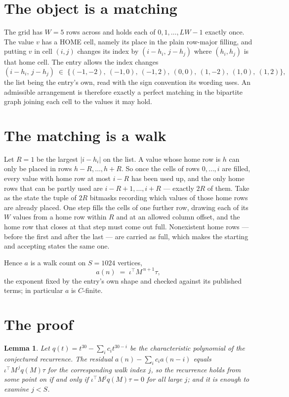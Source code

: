 \documentclass[11pt,a4paper]{article}
\theoremstyle{plain}
\newtheorem{lemma}[theorem]{Lemma}
\theoremstyle{definition}
\begin{document}
\section{The object is a matching}

The grid has $W=5$ rows across and holds each of $0,1,\dots,LW-1$ exactly once. The value
$v$ has a HOME cell, namely its place in the plain row-major filling, and putting $v$ in cell
$(i,j)$ changes its index by $(i-h_i,\,j-h_j)$ where $(h_i,h_j)$ is that home cell. The entry
allows the index changes
\[
(i-h_i,\,j-h_j)\;\in\;\{(-1,-2),\ (-1,0),\ (-1,2),\ (0,0),\ (1,-2),\ (1,0),\ (1,2)\},
\]
the list being the entry's own, read with the sign convention its wording uses. An admissible
arrangement is therefore exactly a perfect matching in the bipartite graph joining each cell to
the values it may hold.

\section{The matching is a walk}

Let $R=1$ be the largest $|i-h_i|$ on the list. A value whose home row is $h$ can only be
placed in rows $h-R,\dots,h+R$. So once the cells of rows $0,\dots,i$ are filled, every
value with home row at most $i-R$ has been used up, and the only home rows that can be
partly used are $i-R+1,\dots,i+R$ --- exactly $2R$ of them. Take as the state the tuple of
$2R$ bitmasks recording which values of those home rows are already placed. One step fills
the cells of one further row, drawing each of its $W$ values from a home row within $R$
and at an allowed column offset, and the home row that closes at that step must come out
full. Nonexistent home rows --- before the first and after the last --- are carried as
full, which makes the starting and accepting states the same one.

Hence $a$ is a walk count on $S=1024$ vertices,
\[
a(n)\;=\;\iota^{\!\top}M^{\,n+1}\tau ,
\]
the exponent fixed by the entry's own shape and checked against its published terms; in
particular $a$ is $C$-finite.

\section{The proof}

\begin{lemma}\label{lem:crit}
Let $q(t)=t^{30}-\sum_i c_it^{30-i}$ be the characteristic polynomial of the
conjectured recurrence. The residual $a(n)-\sum_ic_ia(n-i)$ equals
$\iota^{\!\top}M^{\,j}q(M)\tau$ for the corresponding walk index $j$, so the recurrence
holds from some point on if and only if $\iota^{\!\top}M^{j}q(M)\tau=0$ for all large $j$;
and it is enough to examine $j<S$.
\end{lemma}
\end{document}
